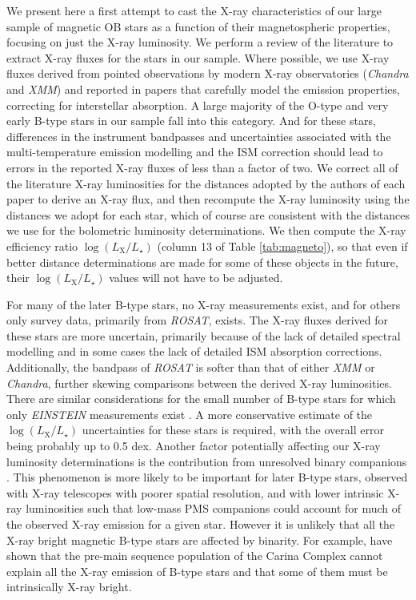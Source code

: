 \documentclass[useAMS,usenatbib]{mn2e}
\newcommand{\ls}{L_\star}
\newcommand{\lx}{L_\mathrm{X}}
\newcommand{\lxls}{\log(\lx/\ls)}
\begin{document}
We present here a first attempt to cast the X-ray characteristics of our large sample of magnetic OB stars as a function of their magnetospheric properties, focusing on just the X-ray luminosity.
We perform a review of the literature to extract X-ray fluxes for the stars in our sample. Where possible, we use X-ray fluxes derived from pointed observations by modern X-ray observatories (\textit{Chandra} and \textit{XMM}) and reported in papers that carefully model the emission properties, correcting for interstellar absorption. A large majority of the O-type and very early B-type stars in our sample fall into this category. And for these stars, differences in the instrument bandpasses and uncertainties associated with the multi-temperature emission modelling and the ISM correction should lead to errors in the reported X-ray fluxes of less than a factor of two. We correct all of the literature X-ray luminosities for the distances adopted by the authors of each paper to derive an X-ray flux, and then recompute the X-ray luminosity using the distances we adopt for each star, which of course are consistent with the distances we use for the bolometric luminosity determinations. We then compute the X-ray efficiency ratio $\lxls$ (column 13 of Table \ref{tab:magneto}), so that even if better distance determinations are made for some of these objects in the future, their $\lxls$ values will not have to be adjusted. 


For many of the later B-type stars, no X-ray measurements exist, and for others only survey data, primarily from \textit{ROSAT}, exists. The X-ray fluxes derived for these stars are more uncertain, primarily because of  the lack of detailed spectral modelling and in some cases the lack of detailed ISM absorption corrections. Additionally, the bandpass of \textit{ROSAT} is softer than that of either \textit{XMM} or \textit{Chandra}, further skewing comparisons between the derived X-ray luminosities. There are similar considerations for the small number of B-type stars for which only \textit{EINSTEIN} measurements exist \citep{1992ApJS...81..795G}. A more conservative estimate of the $\lxls$ uncertainties for these stars is required, with the overall error being probably up to 0.5 dex. Another factor potentially affecting our X-ray luminosity determinations is the contribution from unresolved binary companions \citep[e.g.][]{2012arXiv1205.3538P}. This phenomenon is more likely to be important for later B-type stars, observed with X-ray telescopes with poorer spatial resolution, and with lower intrinsic X-ray luminosities such that low-mass PMS companions could account for much of the observed X-ray emission for a given star.  However it is unlikely that all the X-ray bright magnetic B-type stars are affected by binarity. For example, \citet{2011ApJS..194....5G} have shown that the pre-main sequence population of the Carina Complex cannot explain all the X-ray emission of B-type stars and that some of them must be intrinsically X-ray bright. 
\end{document}
